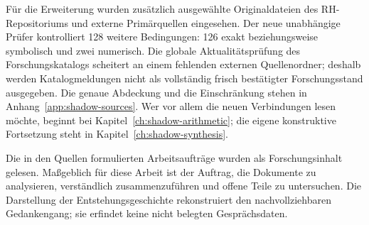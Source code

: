 \documentclass[11pt,a4paper,oneside,parskip=half,headings=normal]{scrreprt}
\begin{document}
Für die Erweiterung wurden zusätzlich ausgewählte Originaldateien des RH-Repositoriums und externe Primärquellen eingesehen. Der neue unabhängige Prüfer kontrolliert 128 weitere Bedingungen: 126 exakt beziehungsweise symbolisch und zwei numerisch. Die globale Aktualitätsprüfung des Forschungskatalogs scheitert an einem fehlenden externen Quellenordner; deshalb werden Katalogmeldungen nicht als vollständig frisch bestätigter Forschungsstand ausgegeben. Die genaue Abdeckung und die Einschränkung stehen in Anhang~\ref{app:shadow-sources}. Wer vor allem die neuen Verbindungen lesen möchte, beginnt bei Kapitel~\ref{ch:shadow-arithmetic}; die eigene konstruktive Fortsetzung steht in Kapitel~\ref{ch:shadow-synthesis}.

Die in den Quellen formulierten Arbeitsaufträge wurden als Forschungsinhalt gelesen. Maßgeblich für diese Arbeit ist der Auftrag, die Dokumente zu analysieren, verständlich zusammenzuführen und offene Teile zu untersuchen. Die Darstellung der Entstehungsgeschichte rekonstruiert den nachvollziehbaren Gedankengang; sie erfindet keine nicht belegten Gesprächsdaten.

\tableofcontents
\clearpage
{}















\appendix


\end{document}
